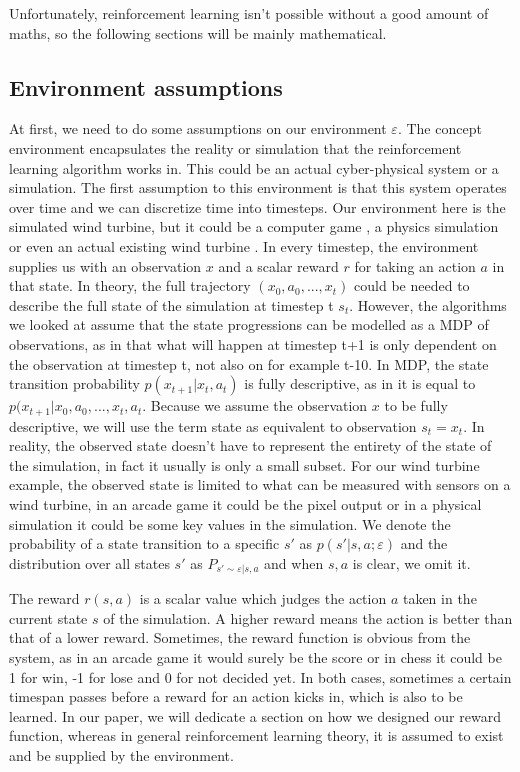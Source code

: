 \documentclass[hyperref,german,beleg]{cgvpub}
\begin{document}
Unfortunately, reinforcement learning isn't possible without a good amount of maths, so the following sections will be mainly mathematical.

\subsection{Environment assumptions}

At first, we need to do some assumptions on our environment $\varepsilon$. The concept environment encapsulates the reality or simulation that the reinforcement learning algorithm works in. This could be an actual cyber-physical system or a simulation. The first assumption to this environment is that this system operates over time and we can discretize time into timesteps. Our environment here is the simulated wind turbine, but it could be a computer game \cite{lillicrapCONTINUOUSCONTROLDEEP2015}, a physics simulation\cite{brockmanOpenAIGym2016} or even an actual existing wind turbine \cite{kolterDesignAnalysisLearning2012}. 
In every timestep, the environment supplies us with an observation \(x\) and a scalar reward \(r\) for taking an action \(a\) in that state. In theory, the full trajectory \((x_0, a_0, ..., x_t)\) could be needed to describe the full state of the simulation at timestep t \(s_t\). However, the algorithms we looked at assume that the state progressions can be modelled as a \ac{MDP} of observations, as in that what will happen at timestep t+1 is only dependent on the observation at timestep t, not also on for example t-10. In \ac{MDP}, the state transition probability \(p(x_{t+1}|x_t, a_t)\) is fully descriptive, as in it is equal to \(p(x_{t+1}|x_0, a_0, ..., x_t, a_t\). Because we assume the observation \(x\) to be fully descriptive, we will use the term state as equivalent to observation \(s_t = x_t\). In reality, the observed state doesn't have to represent the entirety of the state of the simulation, in fact it usually is only a small subset. For our wind turbine example, the observed state is limited to what can be measured with sensors on a wind turbine, in an arcade game it could be the pixel output or in a physical simulation it could be some key values in the simulation. We denote the probability of a state transition to a specific $s'$ as $p(s'|s,a;\varepsilon)$ and the distribution over all states $s'$ as $P_{s' \sim \varepsilon | s,a}$ and when $s,a$ is clear, we omit it.

The reward \(r(s,a)\) is a scalar value which judges the action $a$ taken in the current state $s$ of the simulation. A higher reward means the action is better than that of a lower reward. Sometimes, the reward function is obvious from the system, as in an arcade game it would surely be the score or in chess it could be 1 for win, -1 for lose and 0 for not decided yet. In both cases, sometimes a certain timespan passes before a reward for an action kicks in, which is also to be learned. In our paper, we will dedicate a section on how we designed our reward function, whereas in general reinforcement learning theory, it is assumed to exist and be supplied by the environment.
\end{document}
